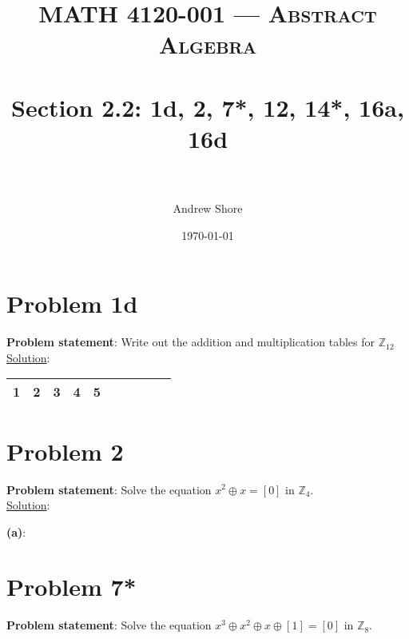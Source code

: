 \documentclass{article} %
\title{ 
\normalfont \normalsize 
\textsc{MATH 4120-001 --- Abstract Algebra} \\
\horrule{0.5pt} \\[0cm] %
\huge Section 2.2: 1d, 2, 7*, 12, 14*, 16a, 16d \\ %
\horrule{2pt} \\[0cm] %
}
\author{Andrew Shore} %
\date{\normalsize\today} %
\begin{document}
\maketitle %

\section*{Problem 1d}


\textbf{Problem statement}: Write out the addition and multiplication tables for $\mathbb{Z}_{12}$
\\

\underline{Solution}: 
\begin{addmargin}[1em]{0em}
\begin{tabular}{|c|c|c|c|c|c|c|c|c|c|}
\hline
1&2&3&4&5 \\ \hline
\end{tabular}
\end{addmargin}    

\newpage

\section*{Problem 2}

\textbf{Problem statement}: Solve the equation $x^2 \oplus x = [0]$ in $\mathbb{Z}_4$.
\\

\underline{Solution}: 
\begin{addmargin}[1em]{0em}
\textbf{(a)}:
\begin{addmargin}[1em]{0em}
\end{addmargin}
\end{addmargin}

\newpage

\section*{Problem 7*}


\textbf{Problem statement}: Solve the equation $x^3 \oplus x^2 \oplus x \oplus [1] = [0]$ in $\mathbb{Z}_8$.
\\
\end{document}
